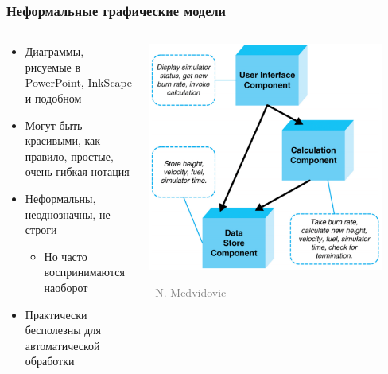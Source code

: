 \documentclass[xetex,mathserif,serif]{beamer}
\newcommand{\attribution}[1] {
    \vspace{-5mm}\begin{flushright}\begin{scriptsize}\textcolor{gray}{\textcopyright\, #1}\end{scriptsize}\end{flushright}
}
\begin{document}
    \begin{frame}
        \frametitle{Неформальные графические модели}
        \begin{columns}
            \begin{column}{0.5\textwidth}
                \begin{itemize}
                    \item Диаграммы, рисуемые в PowerPoint, InkScape и подобном
                    \item Могут быть красивыми, как правило, простые, очень гибкая нотация
                    \item Неформальны, неоднозначны, не строги
                    \begin{itemize}
                        \item Но часто воспринимаются наоборот
                    \end{itemize}
                    \item Практически бесполезны для автоматической обработки
                \end{itemize}
            \end{column}
            \begin{column}{0.5\textwidth}
                \begin{center}
                    \includegraphics[width=0.9\textwidth]{informalModel.png}
                    \attribution{N. Medvidovic}
                \end{center}
            \end{column}
        \end{columns}
    \end{frame}
\end{document}
